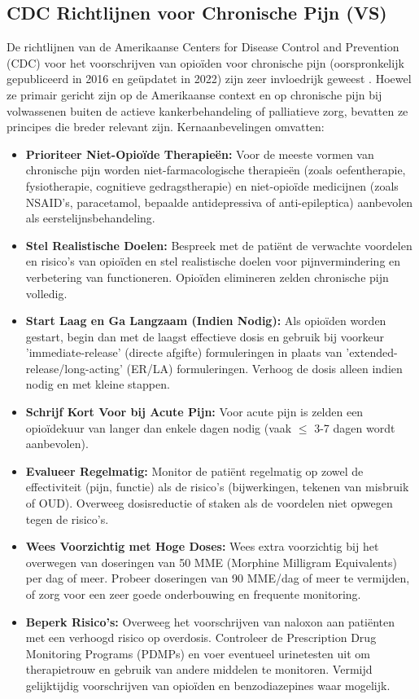 \documentclass[11pt, a4paper]{report} %
\begin{document}
\subsection{CDC Richtlijnen voor Chronische Pijn (VS)}
De richtlijnen van de Amerikaanse Centers for Disease Control and Prevention (CDC) voor het voorschrijven van opioïden voor chronische pijn (oorspronkelijk gepubliceerd in 2016 en geüpdatet in 2022) zijn zeer invloedrijk geweest \parencite{CDCPreventingOverdose}. Hoewel ze primair gericht zijn op de Amerikaanse context en op chronische pijn bij volwassenen buiten de actieve kankerbehandeling of palliatieve zorg, bevatten ze principes die breder relevant zijn. Kernaanbevelingen omvatten:
\begin{itemize}
    \item \textbf{Prioriteer Niet-Opioïde Therapieën:} Voor de meeste vormen van chronische pijn worden niet-farmacologische therapieën (zoals oefentherapie, fysiotherapie, cognitieve gedragstherapie) en niet-opioïde medicijnen (zoals NSAID's, paracetamol, bepaalde antidepressiva of anti-epileptica) aanbevolen als eerstelijnsbehandeling.
    \item \textbf{Stel Realistische Doelen:} Bespreek met de patiënt de verwachte voordelen en risico's van opioïden en stel realistische doelen voor pijnvermindering en verbetering van functioneren. Opioïden elimineren zelden chronische pijn volledig.
    \item \textbf{Start Laag en Ga Langzaam (Indien Nodig):} Als opioïden worden gestart, begin dan met de laagst effectieve dosis en gebruik bij voorkeur 'immediate-release' (directe afgifte) formuleringen in plaats van 'extended-release/long-acting' (ER/LA) formuleringen. Verhoog de dosis alleen indien nodig en met kleine stappen.
    \item \textbf{Schrijf Kort Voor bij Acute Pijn:} Voor acute pijn is zelden een opioïdekuur van langer dan enkele dagen nodig (vaak $\leq$ 3-7 dagen wordt aanbevolen).
    \item \textbf{Evalueer Regelmatig:} Monitor de patiënt regelmatig op zowel de effectiviteit (pijn, functie) als de risico's (bijwerkingen, tekenen van misbruik of OUD). Overweeg dosisreductie of staken als de voordelen niet opwegen tegen de risico's.
    \item \textbf{Wees Voorzichtig met Hoge Doses:} Wees extra voorzichtig bij het overwegen van doseringen van 50 MME (Morphine Milligram Equivalents) per dag of meer. Probeer doseringen van 90 MME/dag of meer te vermijden, of zorg voor een zeer goede onderbouwing en frequente monitoring.
    \item \textbf{Beperk Risico's:} Overweeg het voorschrijven van naloxon aan patiënten met een verhoogd risico op overdosis. Controleer de Prescription Drug Monitoring Programs (PDMPs) en voer eventueel urinetesten uit om therapietrouw en gebruik van andere middelen te monitoren. Vermijd gelijktijdig voorschrijven van opioïden en benzodiazepines waar mogelijk.
\end{itemize}
\end{document}
